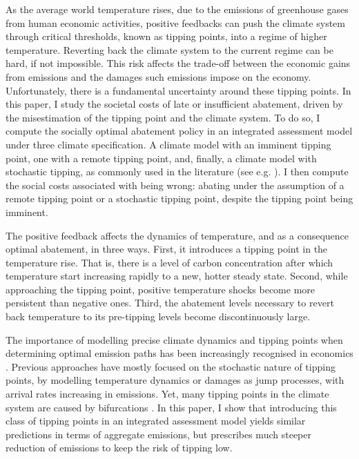 \documentclass[../../main.tex]{subfiles}
\begin{document}
As the average world temperature rises, due to the emissions of greenhouse gases from human economic activities, positive feedbacks can push the climate system through critical thresholds, known as tipping points, into a regime of higher temperature. Reverting back the climate system to the current regime can be hard, if not impossible. This risk affects the trade-off between the economic gains from emissions and the damages such emissions impose on the economy. Unfortunately, there is a fundamental uncertainty around these tipping points. In this paper, I study the societal costs of late or insufficient abatement, driven by the misestimation of the tipping point and the climate system. To do so, I compute the socially optimal abatement policy in an integrated assessment model under three climate specification. A climate model with an imminent tipping point, one with a remote tipping point, and, finally, a climate model with stochastic tipping, as commonly used in the literature (see e.g. \citealt{van_der_ploeg_climate_2018,lemoine_ambiguous_2016,hambel_optimal_2021}). I then compute the social costs associated with being wrong: abating under the assumption of a remote tipping point or a stochastic tipping point, despite the tipping point being imminent.


\iffalse

The positive feedback affects the dynamics of temperature, and as a consequence optimal abatement, in three ways. First, it introduces a tipping point in the temperature rise. That is, there is a level of carbon concentration after which temperature start increasing rapidly to a new, hotter steady state. Second, while approaching the tipping point, positive temperature shocks become more persistent than negative ones. Third, the abatement levels necessary to revert back temperature to its pre-tipping levels become discontinuously large. 

The importance of modelling precise climate dynamics and tipping points when determining optimal emission paths has been increasingly recognised in economics \citep{van_den_bremer_risk-adjusted_2021,dietz_economic_2021,dietz_are_2020,taconet_social_2021,lontzek_stochastic_2015}. Previous approaches have mostly focused on the stochastic nature of tipping points, by modelling temperature dynamics \citep{dietz_economic_2021} or damages \citep{lontzek_stochastic_2015} as jump processes, with arrival rates increasing in emissions. Yet, many tipping points in the climate system are caused by bifurcations \citep{ashwin_extreme_2020,ashwin_tipping_2012}. In this paper, I show that introducing this class of tipping points in an integrated assessment model yields similar predictions in terms of aggregate emissions, but prescribes much steeper reduction of emissions to keep the risk of tipping low.
\end{document}
